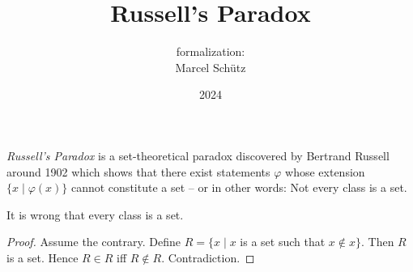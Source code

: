 \documentclass{article}
\title{Russell's Paradox}
\author{\Naproche formalization:\\[0.5em]Marcel Schütz}
\date{2024}
\begin{document}
  \maketitle

  \noindent \emph{Russell's Paradox} is a set-theoretical paradox discovered by
  Bertrand Russell around 1902 \cite[chapter XV]{Frege1980} which shows that 
  there exist statements $\varphi$ whose extension
  $\{x\mid\varphi(x)\}$ cannot constitute a set -- or in other words:
  Not every class is a set.

  \begin{forthel}
    \begin{theorem*}[title=Russell's Paradox,id=russell_paradox]
      It is wrong that every class is a set.
    \end{theorem*}
    \begin{proof}
      Assume the contrary.
      Define $R = \{x \mid x$ is a set such that $x \notin x\}$.
      Then $R$ is a set.
      Hence $R \in R$ iff $R \notin R$.
      Contradiction.
    \end{proof}
  \end{forthel}

  \printbibliography
\end{document}
